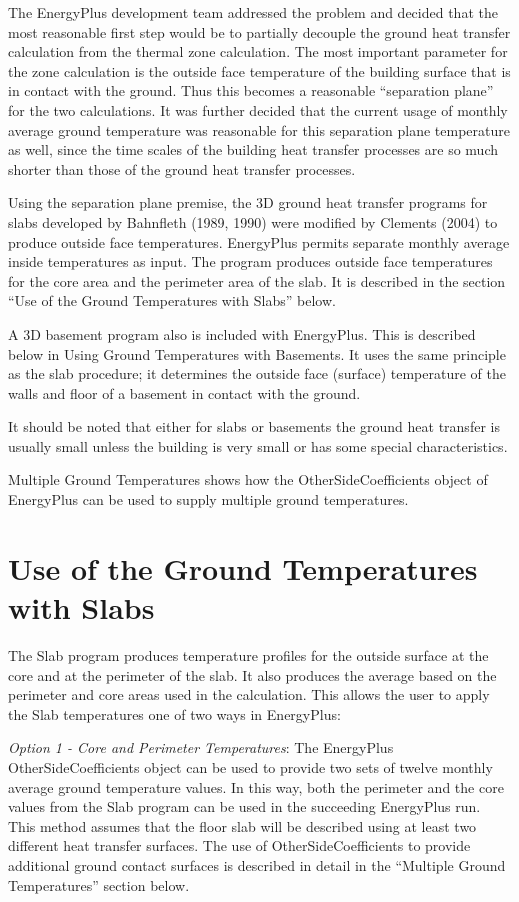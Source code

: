The EnergyPlus development team addressed the problem and decided that the most reasonable first step would be to partially decouple the ground heat transfer calculation from the thermal zone calculation. The most important parameter for the zone calculation is the outside face temperature of the building surface that is in contact with the ground. Thus this becomes a reasonable ``separation plane'' for the two calculations. It was further decided that the current usage of monthly average ground temperature was reasonable for this separation plane temperature as well, since the time scales of the building heat transfer processes are so much shorter than those of the ground heat transfer processes.

Using the separation plane premise, the 3D ground heat transfer programs for slabs developed by Bahnfleth (1989, 1990) were modified by Clements (2004) to produce outside face temperatures. EnergyPlus permits separate monthly average inside temperatures as input. The program produces outside face temperatures for the core area and the perimeter area of the slab. It is described in the section ``Use of the Ground Temperatures with Slabs'' below.

A 3D basement program also is included with EnergyPlus. This is described below in Using Ground Temperatures with Basements. It uses the same principle as the slab procedure; it determines the outside face (surface) temperature of the walls and floor of a basement in contact with the ground.

It should be noted that either for slabs or basements the ground heat transfer is usually small unless the building is very small or has some special characteristics.

Multiple Ground Temperatures shows how the OtherSideCoefficients object of EnergyPlus can be used to supply multiple ground temperatures.

\section{Use of the Ground Temperatures with Slabs}\label{use-of-the-ground-temperatures-with-slabs}

The Slab program produces temperature profiles for the outside surface at the core and at the perimeter of the slab. It also produces the average based on the perimeter and core areas used in the calculation. This allows the user to apply the Slab temperatures one of two ways in EnergyPlus:

\emph{Option 1 - Core and Perimeter Temperatures}: The EnergyPlus OtherSideCoefficients object can be used to provide two sets of twelve monthly average ground temperature values. In this way, both the perimeter and the core values from the Slab program can be used in the succeeding EnergyPlus run. This method assumes that the floor slab will be described using at least two different heat transfer surfaces. The use of OtherSideCoefficients to provide additional ground contact surfaces is described in detail in the ``Multiple Ground Temperatures'' section below.

